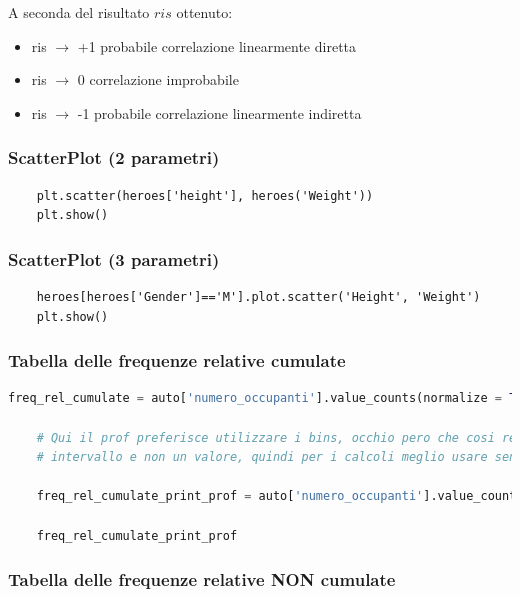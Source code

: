 \documentclass{article}
\begin{document}
A seconda del risultato $ris$ ottenuto:

\begin{itemize}
    \item ris $\to$ +1 probabile correlazione linearmente diretta
    \item ris $\to$ 0 correlazione improbabile
    \item ris $\to$ -1 probabile correlazione linearmente indiretta
\end{itemize}

\subsubsection*{ScatterPlot (2 parametri)}

\begin{lstlisting}
    plt.scatter(heroes['height'], heroes('Weight'))
    plt.show()
\end{lstlisting}

\subsubsection*{ScatterPlot (3 parametri)}

\begin{lstlisting}
    heroes[heroes['Gender']=='M'].plot.scatter('Height', 'Weight')
    plt.show()
\end{lstlisting}

\subsubsection*{Tabella delle frequenze relative cumulate}

\begin{lstlisting}[language=Python]
    freq_rel_cumulate = auto['numero_occupanti'].value_counts(normalize = True).sort_index().cumsum()

    # Qui il prof preferisce utilizzare i bins, occhio pero che cosi restituisce un 
    # intervallo e non un valore, quindi per i calcoli meglio usare senza bins

    freq_rel_cumulate_print_prof = auto['numero_occupanti'].value_counts(normalize = True, bins = 10).sort_index().cumsum()

    freq_rel_cumulate_print_prof
\end{lstlisting}

\subsubsection*{Tabella delle frequenze relative NON cumulate}
\end{document}
